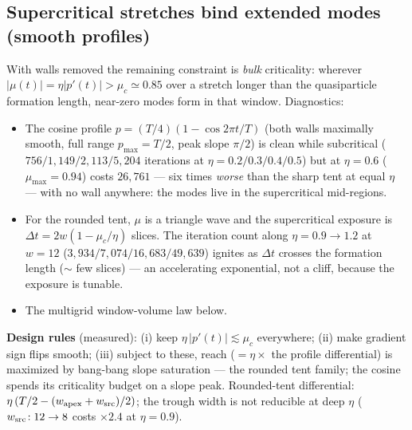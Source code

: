 \documentclass[11pt]{article}
\newcommand{\muc}{\mu_c}
\begin{document}
\subsection{Supercritical stretches bind extended modes (smooth profiles)}
With walls removed the remaining constraint is \emph{bulk} criticality:
wherever $|\mu(t)|=\eta|p'(t)|>\muc\simeq0.85$ over a stretch longer than
the quasiparticle formation length, near-zero modes form in that window.
Diagnostics:
\begin{itemize}
\item The cosine profile $p=(T/4)(1-\cos 2\pi t/T)$ (both walls maximally
smooth, full range $p_{\max}=T/2$, peak slope $\pi/2$) is clean while
subcritical ($756/1{,}149/2{,}113/5{,}204$ iterations at
$\eta=0.2/0.3/0.4/0.5$) but at $\eta=0.6$ ($\mu_{\max}=0.94$) costs
$26{,}761$ --- six times \emph{worse} than the sharp tent at equal
$\eta$ --- with no wall anywhere: the modes live in the supercritical
mid-regions.
\item For the rounded tent, $\mu$ is a triangle wave and the supercritical
exposure is $\Delta t = 2w(1-\muc/\eta)$ slices.  The iteration count
along $\eta=0.9\to1.2$ at $w=12$ ($3{,}934/7{,}074/16{,}683/49{,}639$)
ignites as $\Delta t$ crosses the formation length ($\sim$ few slices) ---
an accelerating exponential, not a cliff, because the exposure is tunable.
\item The multigrid window-volume law below.
\end{itemize}

\noindent\textbf{Design rules} (measured): (i) keep
$\eta\,|p'(t)|\lesssim\muc$ everywhere; (ii) make gradient sign flips
smooth; (iii) subject to these, reach ($=\eta\times$ the profile
differential) is maximized by bang-bang slope saturation --- the rounded
tent family; the cosine spends its criticality budget on a slope peak.
Rounded-tent differential: $\eta\,(T/2-(w_{\rm apex}+w_{\rm src})/2)$;
the trough width is not reducible at deep $\eta$
($w_{\rm src}\!:12\to8$ costs $\times2.4$ at $\eta=0.9$).
\end{document}
